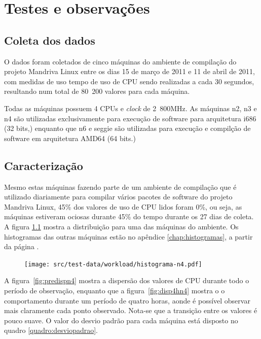 \chapter{Testes e observações}\label{sec:resultados}

\section{Coleta dos dados}\label{sec:coleta}

O dados foram coletados de cinco máquinas do ambiente de compilação do
projeto Mandriva Linux entre os dias 15 de março de 2011 e 11 de abril de
2011, com medidas de uso tempo de uso de CPU sendo realizadas a cada 30
segundos, resultando num total de 80~200 valores para cada máquina.

Todas as máquinas possuem 4 CPUs e \emph{clock} de 2~800MHz. As máquinas n2,
n3 e n4 são utilizadas exclusivamente para execução de software para
arquitetura i686 (32 bits,) enquanto que n6 e seggie são utilizadas para
execução e compilção de software em arquitetura AMD64 (64 bits.)

\section{Caracterização}

Mesmo estas máquinas fazendo parte de um ambiente de compilação que é
utilizado diariamente para compilar vários pacotes de software do projeto
Mandriva Linux, 45\% dos valores de uso de CPU lidos foram 0\%, ou seja,
as máquinas estiveram ociosas durante 45\% do tempo durante os 27 dias de
coleta. A figura \ref{fig:prehistn4} mostra a distribuição para uma das
máquinas do ambiente. Os histogramas das outras máquinas estão no apêndice
\ref{chap:histogramas}, a partir da página \pageref{chap:histogramas}.

\begin{figure}[htp]
\centering
\texttt{[image: src/test-data/workload/histograma-n4.pdf]}
\label{fig:prehistn4}
\end{figure}


A figura~\ref{fig:predispn4} mostra a dispersão dos valores de CPU durante
todo o período de observação, enquanto que a figura~\ref{fig:disp4hn4}
mostra o o comportamento durante um período de quatro horas, aonde é
possível observar mais claramente cada ponto observado. Nota-se que a
transição entre os valores é pouco suave. O valor do desvio padrão para
cada máquina está disposto no quadro \ref{quadro:desviopadrao}.

